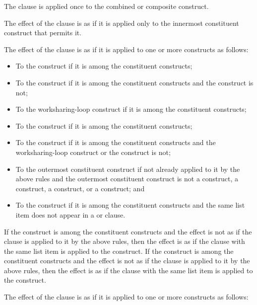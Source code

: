 The  clause is applied once to the combined or composite construct.

The effect of the  clause is as if it is applied only to the innermost 
constituent construct that permits it.

The effect of the  clause is as if it is applied to one or 
more constructs as follows:

\begin{itemize}
\item To the  construct if it is among the constituent constructs;
\item To the  construct if it is among the constituent constructs and 
      the  construct is not;
\item To the worksharing-loop construct if it is among the constituent constructs;
\item To the  construct if it is among the constituent constructs;
\item To the  construct if it is among the constituent constructs 
      and the worksharing-loop construct or the  construct is not;
\item To the outermost constituent construct if not already applied to it by the 
      above rules and the outermost constituent construct is not a  
      construct, a  construct, a  construct,
      or a  construct; and
\item To the  construct if it is among the constituent
      constructs and the same list item does not appear in a  
      or  clause.
\end{itemize}

If the  construct is among the constituent constructs and the
effect is not as if the  clause is applied to it by the
above rules, then the effect is as if the  clause with the same
list item is applied to the  construct. If the  
construct is among the constituent constructs and the effect is not as if the 
 clause is applied to it by the above rules, then the effect 
is as if the  clause with the same list item is applied to the 
 construct.

The effect of the  clause is as if it is applied to one or 
more constructs as follows: 

